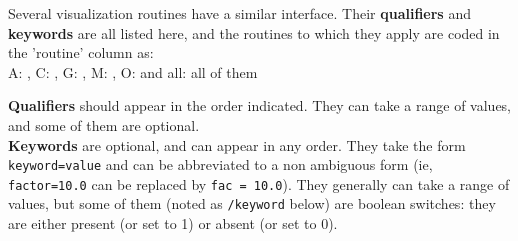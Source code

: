 
Several visualization routines have a similar interface. Their \textbf{qualifiers} and
\textbf{keywords} are all listed here, and the routines to which they apply are coded
in the 'routine' column as: \\
A: ,
C: ,
G: , 
M: ,
O:  and all: all of them
\vskip 0.4cm

\textbf{Qualifiers} should appear in the order indicated. They can take a range of values, and some of them are optional.\\
\textbf{Keywords} are optional, and can appear in any order. They take the form \texttt{keyword=value} and can be abbreviated to a non ambiguous form
(ie, \texttt{factor=10.0} can be replaced by \texttt{fac = 10.0}). They generally can take a range of values, but
some of them (noted as \texttt{/keyword} below) are boolean switches: they are either present (or set to 1) or absent (or set
to 0).

